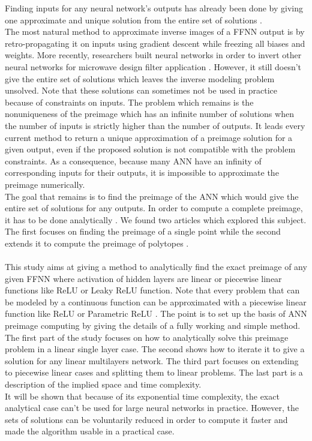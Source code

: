 \documentclass{article}
\begin{document}
Finding inputs for any neural network’s outputs has already been done by giving one approximate and unique solution from the entire set of
solutions \cite{dua2000inversion}.\\
The most natural method to approximate inverse images of a FFNN output is by retro-propagating it on inputs using gradient descent while
freezing all biases and weights. More recently, researchers built neural networks
in order to invert other neural networks for microwave design filter application
\cite{kabir2008neural}. However, it still doesn’t give the entire set of solutions which leaves the
inverse modeling problem unsolved. Note that these solutions can sometimes
not be used in practice because of constraints on inputs. The problem which
remains is the nonuniqueness of the preimage which has an infinite number
of solutions when the number of inputs is strictly higher than the number of
outputs. It leads every current method to return a unique approximation of a preimage solution for a given output, 
even if the proposed solution is not compatible
with the problem constraints. As a consequence, because many ANN have an infinity of corresponding inputs for their 
outputs, it is impossible to approximate the preimage numerically.\\
The goal that remains is to find the preimage of the ANN which would give the
entire set of solutions for any outputs. In order to compute a complete preimage, it has to be done analytically . We found two
articles which explored this subject. The first focuses on finding the preimage
of a single point \cite{carlsson2016preimage} while the second extends it to compute the preimage of polytopes
\cite{matoba2020computing}.\\\\

This study aims at giving a method to analytically find the exact preimage of any given
FFNN where activation of hidden layers are linear or piecewise linear functions
like ReLU or Leaky ReLU function. Note that every problem that can be modeled by a continuous function can be 
approximated with a piecewise linear function like ReLU or Parametric ReLU \cite{hanin2017approximating}.
The point is to set up the basis of ANN preimage computing by giving the details of a fully working and simple method.
The first part of the study focuses on how to analytically solve this preimage problem in a linear single layer case. 
The second shows how to iterate it to give a solution for any linear multilayers network. The third part focuses
on extending to piecewise linear cases and splitting them to linear problems.
The last part is a description of the implied space and time complexity.\\
It will be shown that because of its exponential time complexity, the exact analytical case can’t be used 
for large neural networks in practice. However, the sets of solutions can be voluntarily reduced in order to compute it 
faster and made the algorithm usable in a practical case.
\newpage
\end{document}

